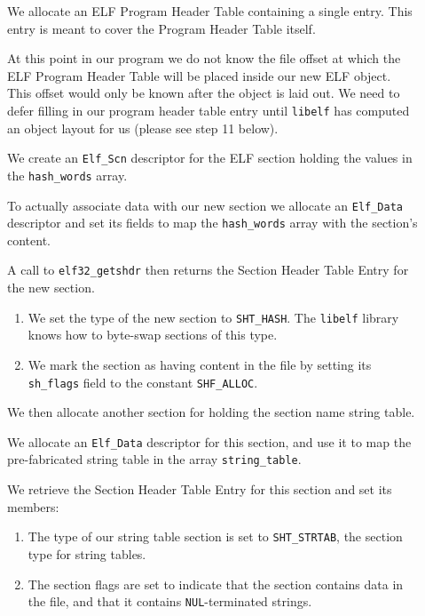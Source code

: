 \documentclass[a4paper,pdftex]{book}
\makeatletter
\newcommand{\constant}[1]{\texttt{#1}}
\newcommand{\function}[1]{\texttt{#1}}
\newcommand{\library}[1]{\texttt{#1}}
\newcommand{\parameter}[1]{\texttt{#1}}
\newcommand{\type}[1]{\texttt{#1}}
\newcommand{\elfdatastructure}[1]{\textsf{#1}}
\newenvironment{callout}[2][black]{%
  \begingroup\newcommand{\@cocolor}{#1}%
  \setlength{\shadowsize}{1.2pt}%
  \newcommand{\@cogroup}[1]{#2}}{\endgroup}
\newcommand{\@co}[1]{\shadowbox{\color{\@cocolor}#1}}
\newcommand{\coref}[1]{%
  \hypertarget{\@cogroup.#1.cr}{%
    \hyperlink{\@cogroup.#1.co}{\@co{#1}}}}
\makeatother
\begin{document}
\begin{callout}{prog5}
\begin{description}
  \item[\coref{7}] We allocate an ELF \elfdatastructure{Program Header
    Table} containing a single entry. This entry is meant to cover the
    \elfdatastructure{Program Header Table} itself.

    At this point in our program we do not know the file offset at
    which the ELF \elfdatastructure{Program Header Table} will be
    placed inside our new ELF object.  This offset would only be known
    after the object is laid out.  We need to defer filling in our
    program header table entry until \library{libelf} has computed an
    object layout for us (please see step 11 below).

  \item[\coref{8}] We create an \type{Elf\_Scn} descriptor for the ELF
    section holding the values in the \parameter{hash\_words} array.

    To actually associate data with our new section we allocate an
    \type{Elf\_Data} descriptor and set its fields to map the
    \parameter{hash\_words} array with the section's content.

    A call to \function{elf32\_getshdr} then returns the
    \elfdatastructure{Section Header Table Entry} for the new section.

    \begin{enumerate}
    \item We set the type of the new section to \constant{SHT\_HASH}.
      The \library{libelf} library knows how to byte-swap sections of
      this type.

    \item We mark the section as having content in the file by setting
      its \parameter{sh\_flags} field to the constant
      \constant{SHF\_ALLOC}.
    \end{enumerate}

  \item[\coref{9}] We then allocate another section for holding the
    section name string
    table.

    We allocate an \type{Elf\_Data} descriptor for this section, and
    use it to map the pre-fabricated string table in the array
    \parameter{string\_table}.

    We retrieve the \elfdatastructure{Section Header Table Entry} for
    this section and set its members:

    \begin{enumerate}
    \item The type of our string table section is set to
      \constant{SHT\_STRTAB}, the section type for string tables.
    \item The section flags are set to indicate that the section
      contains data in the file, and that it contains
      \constant{NUL}-terminated strings.
    \end{enumerate}


\end{description}
\end{callout}
\end{document}
